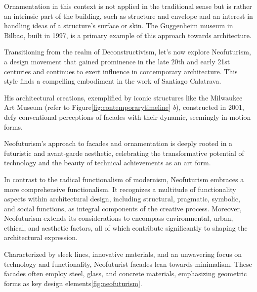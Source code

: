 Ornamentation in this context is not applied in the traditional sense but is rather an intrinsic part of the building, such as structure and envelope and an interest in handling ideas of a structure’s surface or skin\cite{Clement2017}.
The Guggenheim museum in Bilbao, built in 1997, is a primary example of this approach towards architecture.


Transitioning from the realm of Deconstructivism, let's now explore Neofuturism, a design movement that gained prominence in the late 20th and early 21st centuries and continues to exert influence in contemporary architecture.
This style finds a compelling embodiment in the work of Santiago Calatrava\cite{Omale2016}.

His architectural creations, exemplified by iconic structures like the Milwaukee Art Museum (refer to Figure\ref{fig:contemporarytimeline} \textit{b}), constructed in 2001, defy conventional perceptions of facades with their dynamic, seemingly in-motion forms\cite{Tyc2018}.

Neofuturism's approach to facades and ornamentation is deeply rooted in a futuristic and avant-garde aesthetic, celebrating the transformative potential of technology and the beauty of technical achievements as an art form\cite{Tyc2018}.

In contrast to the radical functionalism of modernism, Neofuturism embraces a more comprehensive functionalism.
It recognizes a multitude of functionality aspects within architectural design, including structural, pragmatic, symbolic, and social functions, as integral components of the creative process.
Moreover, Neofuturism extends its considerations to encompass environmental, urban, ethical, and aesthetic factors, all of which contribute significantly to shaping the architectural expression\cite{Omale2016}.

Characterized by sleek lines, innovative materials, and an unwavering focus on technology and functionality, Neofuturist facades lean towards minimalism.
These facades often employ steel, glass, and concrete materials, emphasizing geometric forms as key design elements\ref{fig:neofuturism}.

